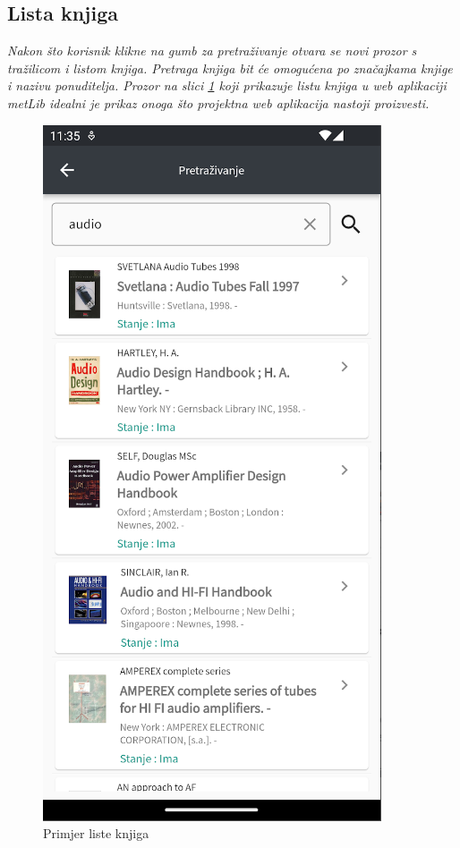 	\subsection{Lista knjiga}
	
	\textit{Nakon što korisnik klikne na gumb za pretraživanje otvara se novi prozor s tražilicom i listom knjiga. Pretraga knjiga bit će omogućena po značajkama knjige i nazivu ponuditelja. Prozor na slici \ref{fig:lista knjiga} koji prikazuje listu knjiga u web aplikaciji metLib idealni je prikaz onoga što projektna web aplikacija nastoji proizvesti.}
	
	\begin{figure}[H]
		\includegraphics[scale=0.4]{slike/BookList.PNG} %
		\centering
		\caption{Primjer liste knjiga}
		\label{fig:lista knjiga}
	\end{figure}
	
